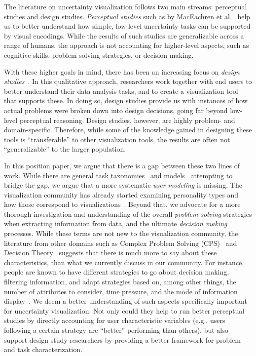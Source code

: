 
The literature on uncertainty visualization follows two main streams: perceptual studies and design studies.
\emph{Perceptual studies} such as by MacEachren et al.~\citep{MacEachren:2012} 
help us to better understand 
how simple, low-level uncertainty tasks can be supported by visual encodings. 
While the results of such studies are generalizable across a  
range of humans, the approach is not accounting for higher-level aspects, such as cognitive skills,
problem solving strategies, or decision making.

With these higher goals in mind, there has been an increasing focus on \emph{design studies}~\citep{Sedlmair:2012}.
In this qualitative approach, researchers work together with end users to better understand their 
data analysis tasks, and to create a visualization tool
that supports these. In doing so, design studies provide us with instances of how
actual problems were broken down into design decisions, going far beyond
low-level perceptual reasoning. Design studies, however, are highly problem- and domain-specific.
Therefore, while some of the knowledge gained in designing these tools is
``transferable'' to other visualization tools, the results are often not
``generalizable'' to the larger population. %

In this position paper, we argue that there is a gap between these two lines of work.
While there are general task taxonomies~\citep{Brehmer:2013,Shneiderman:1996} and 
models~\citep{Tory:2004,Sedlmair:2014}
attempting to bridge the gap, we argue that a more systematic \emph{user modeling} is missing.
The visualization community has already started examining personality types and
how those correspond to visualizations~\citep{Conati:2014}. Beyond that, we advocate for a more thorough 
investigation and understanding of the overall \emph{problem solving} strategies when extracting information from data, 
and the ultimate \emph{decision making} processes.
While these terms are not new to the visualization community, the 
literature from other domains such as Complex Problem Solving (CPS)~\citep{Frensch:2005}
and Decision Theory~\citep{Payne:1993} suggests that there is much more to say about these characteristics,
than what we currently discuss in our community. For instance, people are known to have different strategies to go about decision making, filtering information,
and adapt strategies based on, among other things, the number of attributes 
to consider, time pressure, and the mode of information 
display~\cite{Payne:1993}.
We deem a better understanding of such aspects specifically important for uncertainty visualization.
Not only could they help to run better perceptual studies by directly accounting for user characteristic variables 
(e.g., users following a certain strategy are ``better'' performing than others), but also support design study researchers
by providing a better framework for problem and task characterization.

